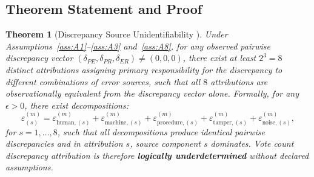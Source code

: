 \documentclass[11pt,a4paper]{article}
\newtheorem{theorem}{Theorem}[section]
\theoremstyle{definition}
\begin{document}
\subsection{Theorem Statement and Proof}
\begin{theorem}[Discrepancy Source Unidentifiability ]
\label{thm:discrepancy_unident}
Under Assumptions~\ref{ass:A1}--\ref{ass:A3} and~\ref{ass:A8}, for any observed pairwise discrepancy vector $(\delta_{PE}, \delta_{PR}, \delta_{ER}) \neq (0, 0, 0)$, there exist at least $2^3 = 8$ distinct attributions assigning primary responsibility for the discrepancy to different combinations of error sources, such that all $8$ attributions are observationally equivalent from the discrepancy vector alone. Formally, for any $\epsilon > 0$, there exist decompositions:
\begin{equation}
    \varepsilon^{(m)}_{(s)} = \varepsilon^{(m)}_{\text{human},(s)} + \varepsilon^{(m)}_{\text{machine},(s)} + \varepsilon^{(m)}_{\text{procedure},(s)} + \varepsilon^{(m)}_{\text{tamper},(s)} + \varepsilon^{(m)}_{\text{noise},(s)},
    \label{eq:s_decompositions}
\end{equation}
for $s = 1, \ldots, 8$, such that all decompositions produce identical pairwise discrepancies and in attribution $s$, source component $s$ dominates. Vote count discrepancy attribution is therefore \textbf{logically underdetermined} without declared assumptions.
\end{theorem}
\end{document}

